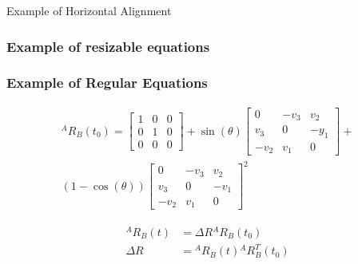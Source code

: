 \documentclass[10pt, aspectratio=169]{beamer}
\theoremstyle{remark}
\theoremstyle{definition}
\begin{document}
\begin{frame}{Example of Horizontal Alignment}
\begin{center}
\begin{minipage}[t]{.35\linewidth}
    \end{minipage}
    \end{center}
\end{frame}

\begin{frame}[allowframebreaks]
\frametitle{Example of resizable equations}

\begin{center}
\end{center}
\end{frame}

\begin{frame}[allowframebreaks]
\frametitle{Example of Regular Equations}
    
    
    \begin{equation}
        \begin{split}
        {}^AR_{B}(t_0)=\left[\begin{array}{ccc}
        1 & 0 & 0 \\
        0 & 1 & 0 \\
        0 & 0 & 0
        \end{array}\right]+
        \sin (\theta)\left[\begin{array}{ccc}
        0 & -v_{3} & v_{2} \\
        v_{3} & 0 & -y_{1} \\
        -v_{2} & v_{1} & 0
        \end{array}\right]+ \\
        (1-\cos (\theta))\left[\begin{array}{ccc}
        0 & -v_{3} & v_{2} \\
        v_{3} & 0 & -v_{1} \\
        -v_{2} & v_{1} & 0
        \end{array}\right]^{2}
        \end{split}
        \end{equation}
        
        \begin{align}
            {}^AR_{B}(t) &= \Delta R {}^AR_{B}(t_0) \\
            \Delta R &= {}^AR_{B}(t) {}^AR_{B}^T(t_0)
        \end{align}
\end{frame}
\end{document}
